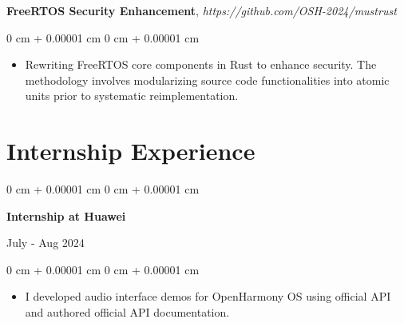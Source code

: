 \documentclass[10pt, letterpaper]{article}
\newenvironment{highlights}{
    \begin{itemize}[
        topsep=0.10 cm,
        parsep=0.10 cm,
        partopsep=0pt,
        itemsep=0pt,
        leftmargin=0 cm + 10pt
    ]
}{
    \end{itemize}
} %
\newenvironment{onecolentry}{
    \begin{adjustwidth}{
        0 cm + 0.00001 cm
    }{
        0 cm + 0.00001 cm
    }
}{
    \end{adjustwidth}
} %
\newenvironment{twocolentry}[2][]{
    \onecolentry
    \def\secondColumn{#2}
    \setcolumnwidth{\fill, 3.95 cm}
    \begin{paracol}{2}
}{
    \switchcolumn \raggedleft \secondColumn
    \end{paracol}
    \endonecolentry
} %
\begin{document}
        \vspace{0.2 cm}

        \textbf{FreeRTOS Security Enhancement},
        \textit{https://github.com/OSH-2024/mustrust}

        \vspace{0.10 cm}
        \begin{onecolentry}
            \begin{highlights}
                \item Rewriting FreeRTOS core components in Rust to enhance security. The methodology involves modularizing source code functionalities into atomic units prior to systematic reimplementation.
            \end{highlights}
        \end{onecolentry}
    
    \section{Internship Experience}

        \begin{samepage}
            \begin{twocolentry}{
                July - Aug 2024
            }
                \textbf{Internship at Huawei}
            \end{twocolentry}

            \vspace{0.10 cm}
            \begin{onecolentry}
                \begin{highlights}
                    \item I developed audio interface demos for OpenHarmony OS using official API and authored official API documentation.
                \end{highlights}
            \end{onecolentry}
        \end{samepage}
\end{document}
